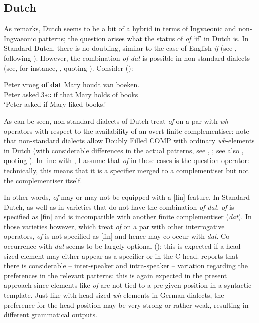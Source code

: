 \subsection{Dutch} \label{sec:3dutch}
As \citet[14]{lass1994} remarks, Dutch seems to be a bit of a hybrid in terms of Ingvaeonic and non-Ingvaeonic patterns; the question arises what the status of \textit{of} `if' in Dutch is. In Standard Dutch, there is no doubling, similar to the case of English \textit{if} (see \citealt{bayer2004}, following \citealt{hoekstra1993}). However, the combination \textit{of dat} is possible in non-standard dialects (see, for instance, \citealt[65, ex. 14]{bayer2004}, quoting \citealt{hoekstra1993}). Consider (\citealt[27--28]{bacskaiatkaribaudisch2018}):

\ea \gll Peter vroeg \textbf{of} \textbf{dat} Mary houdt van boeken. \label{dutchofdat}\\
Peter asked.\textsc{3sg} if that Mary holds of books\\
\glt `Peter asked if Mary liked books.'
\z

\begin{sloppypar}
As can be seen, non-standard dialects of Dutch treat \textit{of} on a par with \textit{wh}-operators with respect to the availability of an overt finite complementiser: note that non-standard dialects allow Doubly Filled COMP with ordinary \textit{wh}-el\-e\-ments in Dutch (with considerable differences in the actual patterns, see \citealt[1612--1613]{barbiers2009}, \citealt{vancraenenbroeck2010}; see also \citealt{bayer2004}, quoting \citealt{hoekstra1993}). In line with \citet[141--142]{boef2013}, I assume that \textit{of} in these cases is the question operator: technically, this means that it is a specifier merged to a complementiser but not the complementiser itself. 
\end{sloppypar}

In other words, \textit{of} may or may not be equipped with a [fin] feature. In Standard Dutch, as well as in varieties that do not have the combination \textit{of dat}, \textit{of} is specified as [fin] and is incompatible with another finite complementiser (\textit{dat}). In those varieties however, which treat \textit{of} on a par with other interrogative operators, \textit{of} is not specified as [fin] and hence may co-occur with \textit{dat}. Co-occurrence with \textit{dat} seems to be largely optional (\citealt[1612]{barbiers2009}); this is expected if a head-sized element may either appear as a specifier or in the C head. \citet[1612--1613]{barbiers2009} reports that there is considerable -- inter-speaker and intra-speaker -- variation regarding the preferences in the relevant patterns: this is again expected in the present approach since elements like \textit{of} are not tied to a pre-given position in a syntactic template. Just like with head-sized \textit{wh}-elements in German dialects, the preference for the head position may be very strong or rather weak, resulting in different grammatical outputs.

